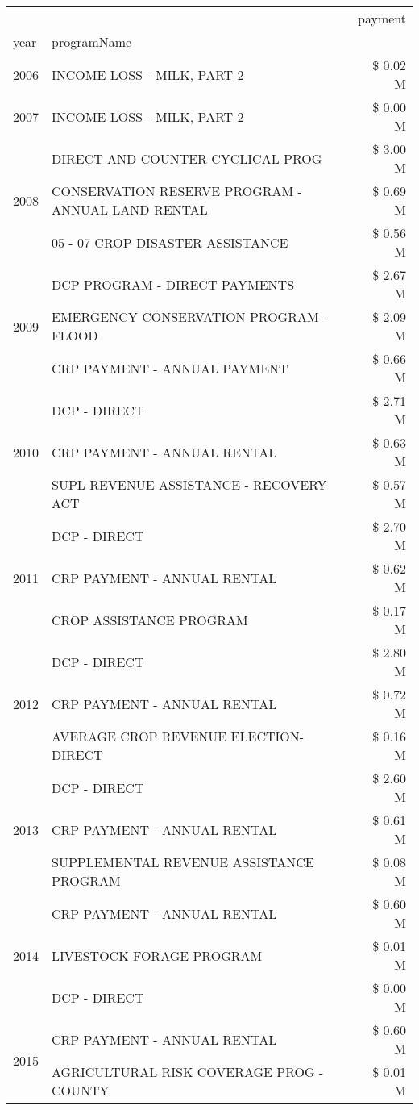 \begin{tabular}{llr}
\toprule
 &  & payment \\
year & programName &  \\
\midrule
2006 & INCOME LOSS - MILK, PART 2 & \$ 0.02 M \\
\cline{1-3}
2007 & INCOME LOSS - MILK, PART 2 & \$ 0.00 M \\
\cline{1-3}
\multirow[t]{3}{*}{2008} & DIRECT AND COUNTER CYCLICAL PROG & \$ 3.00 M \\
 & CONSERVATION RESERVE PROGRAM - ANNUAL LAND RENTAL & \$ 0.69 M \\
 & 05 - 07 CROP DISASTER ASSISTANCE & \$ 0.56 M \\
\cline{1-3}
\multirow[t]{3}{*}{2009} & DCP PROGRAM - DIRECT PAYMENTS & \$ 2.67 M \\
 & EMERGENCY CONSERVATION PROGRAM - FLOOD & \$ 2.09 M \\
 & CRP PAYMENT - ANNUAL PAYMENT & \$ 0.66 M \\
\cline{1-3}
\multirow[t]{3}{*}{2010} & DCP - DIRECT & \$ 2.71 M \\
 & CRP PAYMENT - ANNUAL RENTAL & \$ 0.63 M \\
 & SUPL REVENUE ASSISTANCE - RECOVERY ACT & \$ 0.57 M \\
\cline{1-3}
\multirow[t]{3}{*}{2011} & DCP - DIRECT & \$ 2.70 M \\
 & CRP PAYMENT - ANNUAL RENTAL & \$ 0.62 M \\
 & CROP ASSISTANCE PROGRAM & \$ 0.17 M \\
\cline{1-3}
\multirow[t]{3}{*}{2012} & DCP - DIRECT & \$ 2.80 M \\
 & CRP PAYMENT - ANNUAL RENTAL & \$ 0.72 M \\
 & AVERAGE CROP REVENUE ELECTION-DIRECT & \$ 0.16 M \\
\cline{1-3}
\multirow[t]{3}{*}{2013} & DCP - DIRECT & \$ 2.60 M \\
 & CRP PAYMENT - ANNUAL RENTAL & \$ 0.61 M \\
 & SUPPLEMENTAL REVENUE ASSISTANCE PROGRAM & \$ 0.08 M \\
\cline{1-3}
\multirow[t]{3}{*}{2014} & CRP PAYMENT - ANNUAL RENTAL & \$ 0.60 M \\
 & LIVESTOCK FORAGE PROGRAM & \$ 0.01 M \\
 & DCP - DIRECT & \$ 0.00 M \\
\cline{1-3}
\multirow[t]{3}{*}{2015} & CRP PAYMENT - ANNUAL RENTAL & \$ 0.60 M \\
 & AGRICULTURAL RISK COVERAGE PROG - COUNTY & \$ 0.01 M \\

\end{tabular}
